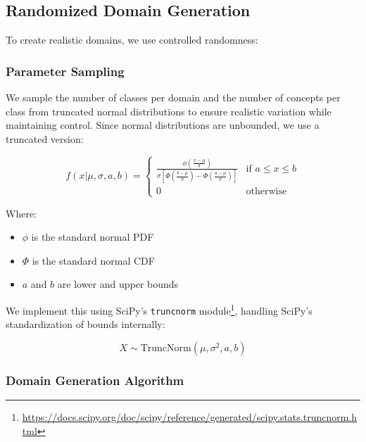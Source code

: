 \subsection{Randomized Domain Generation}

To create realistic domains, we use controlled randomness:

\subsubsection{Parameter Sampling}

We sample the number of classes per domain and the number of concepts per class from truncated normal distributions to ensure realistic variation while maintaining control. Since normal distributions are unbounded, we use a truncated version:

\begin{equation*}
    f(x|\mu, \sigma, a, b) =
    \begin{cases}
        \frac{\phi\left(\frac{x-\mu}{\sigma}\right)}{\sigma\left[\Phi\left(\frac{b-\mu}{\sigma}\right) - \Phi\left(\frac{a-\mu}{\sigma}\right)\right]} & \text{if } a \leq x \leq b \\
        0                                                                                                                                              & \text{otherwise}
    \end{cases}
\end{equation*}

Where:
\begin{itemize}
    \item $\phi$ is the standard normal PDF
    \item $\Phi$ is the standard normal CDF
    \item $a$ and $b$ are lower and upper bounds
\end{itemize}

We implement this using SciPy's \texttt{truncnorm} module\footnote{\url{https://docs.scipy.org/doc/scipy/reference/generated/scipy.stats.truncnorm.html}},
handling SciPy's standardization of bounds internally:

\begin{equation*}
    X \sim \text{TruncNorm}(\mu, \sigma^2, a, b)
\end{equation*}

\subsubsection{Domain Generation Algorithm}

